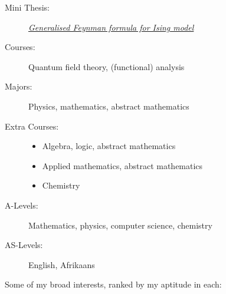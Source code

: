 \documentclass[10pt,a4paper,ragged2e,academicons]{altacv}
\begin{document}
\divider

\begin{description}
    \item[Mini Thesis:] \href{https://doi.org/10.5281/zenodo.8414170}{\textit{Generalised Feynman formula for Ising model}}
    \item[Courses:] Quantum field theory, (functional) analysis
\end{description}

\divider

\begin{description}
    \item[Majors:] Physics, mathematics, abstract mathematics
    \item[Extra Courses:] \quad
    \smallskip
    \begin{itemize}
        \item {} Algebra, logic, abstract mathematics
        \item {} Applied mathematics, abstract mathematics
        \item {} Chemistry
    \end{itemize}
\end{description}

\divider

\begin{description}
    \item[A-Levels:] Mathematics, physics, computer science, chemistry
    \item[AS-Levels:] English, Afrikaans
\end{description}





Some of my broad interests, ranked by my aptitude in each:\\
\vspace{3mm}
\smallskip
{}
\smallskip
{}
\smallskip
{}
\end{document}
